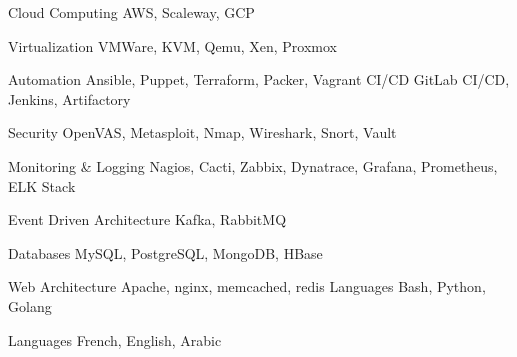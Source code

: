 


\begin{cvskills}


  \cvskill
    {Cloud Computing} %
    {AWS, Scaleway, GCP} %

  \cvskill
    {Virtualization} %
    {VMWare, KVM, Qemu, Xen, Proxmox} %

\cvskill
    {Automation} %
    {Ansible, Puppet, Terraform, Packer, Vagrant} %
\cvskill
    {CI/CD} %
    {GitLab CI/CD, Jenkins, Artifactory} %

  \cvskill
    {Security} %
    {OpenVAS, Metasploit, Nmap, Wireshark, Snort, Vault} %

  \cvskill
    {Monitoring \& Logging} %
    {Nagios, Cacti, Zabbix, Dynatrace, Grafana, Prometheus, ELK Stack} %


\cvskill
    {Event Driven Architecture} %
    {Kafka, RabbitMQ} %

  \cvskill
    {Databases} %
    {MySQL, PostgreSQL, MongoDB, HBase} %

  \cvskill
    {Web Architecture}%
    {Apache, nginx, memcached, redis} %
  \cvskill
    {Languages} %
    {Bash, Python, Golang} %

  \cvskill
    {Languages} %
    {French, English, Arabic} %

\end{cvskills}
